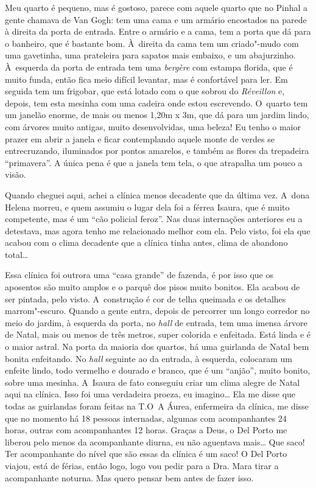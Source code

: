 Meu quarto é pequeno, mas é gostoso, parece com aquele quarto que no
Pinhal a gente chamava de Van Gogh: tem uma cama e um armário encostados
na parede à direita da porta de entrada. Entre o armário e a cama, tem a
porta que dá para o banheiro, que é bastante bom. À~direita da cama tem
um criado"-mudo com uma gavetinha, uma prateleira para sapatos mais
embaixo, e um abajurzinho. À~esquerda da porta de entrada tem uma
\emph{bergère} com estampa florida, que é muito funda, então fica meio
difícil levantar, mas é confortável para ler. Em seguida tem um
frigobar, que está lotado com o que sobrou do \emph{Réveillon} e,
depois, tem esta mesinha com uma cadeira onde estou escrevendo. O~quarto
tem um janelão enorme, de mais ou menos 1,20m x 3m, que dá para um
jardim lindo, com árvores muito antigas, muito desenvolvidas, uma
beleza! Eu tenho o maior prazer em abrir a janela e ficar contemplando
aquele monte de verdes se entrecruzando, iluminados por pontos amarelos,
e também as flores da trepadeira ``primavera''. A única pena é que a
janela tem tela, o que atrapalha um pouco a visão.

Quando cheguei aqui, achei a clínica menos decadente que da última vez.
A~dona Helena morreu, e quem assumiu o lugar dela foi a férrea Isaura,
que é muito competente, mas é um ``cão policial feroz''. Nas duas
internações anteriores eu a detestava, mas agora tenho me relacionado
melhor com ela. Pelo visto, foi ela que acabou com o clima decadente que
a clínica tinha antes, clima de abandono total…

Essa clínica foi outrora uma ``casa grande'' de fazenda, é por isso que
os aposentos são muito amplos e o parquê dos pisos muito bonitos. Ela
acabou de ser pintada, pelo visto. A~construção é cor de telha queimada
e os detalhes marrom"-escuro. Quando a gente entra, depois de percorrer
um longo corredor no meio do jardim, à esquerda da porta, no \emph{hall}
de entrada, tem uma imensa árvore de Natal, mais ou menos de três
metros, super colorida e enfeitada. Está linda e é o maior astral. Na
porta da maioria dos quartos, há uma guirlanda de Natal bem bonita
enfeitando. No \emph{hall} seguinte ao da entrada, à esquerda, colocaram
um enfeite lindo, todo vermelho e dourado e branco, que é um ``anjão'',
muito bonito, sobre uma mesinha. A~Isaura de fato conseguiu criar um
clima alegre de Natal aqui na clínica. Isso foi uma verdadeira proeza,
eu imagino… Ela me disse que todas as guirlandas foram feitas na
T.O\,
A Áurea, enfermeira da clínica, me disse que no momento há 18 pessoas
internadas, algumas com acompanhantes 24 horas, outras com acompanhantes
12 horas. Graças a Deus, o Del Porto me liberou pelo menos da
acompanhante diurna, eu não aguentava mais… Que saco! Ter
acompanhante do nível que são essas da clínica é um saco! O Del Porto
viajou, está de férias, então logo, logo vou pedir para a Dra. Mara
tirar a acompanhante noturna. Mas quero pensar bem antes de fazer isso.


